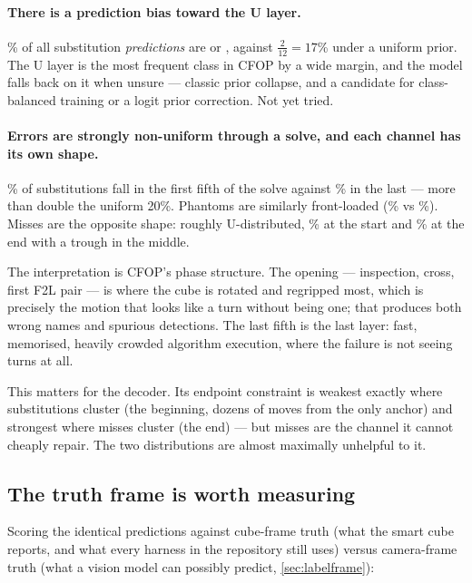 \paragraph{There is a prediction bias toward the U layer.}
\PredUShare\% of all substitution \emph{predictions} are  or ,
against $\tfrac{2}{12}=17$\% under a uniform prior. The U layer is the most
frequent class in CFOP by a wide margin, and the model falls back on it when
unsure --- classic prior collapse, and a candidate for class-balanced
training or a logit prior correction. Not yet tried.

\paragraph{Errors are strongly non-uniform through a solve, and each channel
has its own shape.} \SubFirstFifth\% of substitutions fall in the first
fifth of the solve against \SubLastFifth\% in the last --- more than double
the uniform 20\%. Phantoms are similarly front-loaded
(\PhanFirstFifth\% vs \PhanLastFifth\%). Misses are the opposite shape:
roughly U-distributed, \MissFirstFifth\% at the start and
\MissLastFifth\% at the end with a trough in the middle.

The interpretation is CFOP's phase structure. The opening --- inspection,
cross, first F2L pair --- is where the cube is rotated and regripped most,
which is precisely the motion that looks like a turn without being one; that
produces both wrong names and spurious detections. The last fifth is the
last layer: fast, memorised, heavily crowded algorithm execution, where the
failure is not seeing turns at all.

This matters for the decoder. Its endpoint constraint is weakest exactly
where substitutions cluster (the beginning, dozens of moves from the only
anchor) and strongest where misses cluster (the end) --- but misses are the
channel it cannot cheaply repair. The two distributions are almost
maximally unhelpful to it.

\subsection{The truth frame is worth measuring}
\label{sec:frame-result}

Scoring the identical predictions against cube-frame truth (what the smart
cube reports, and what every harness in the repository still uses) versus
camera-frame truth (what a vision model can possibly predict,
\cref{sec:labelframe}):

